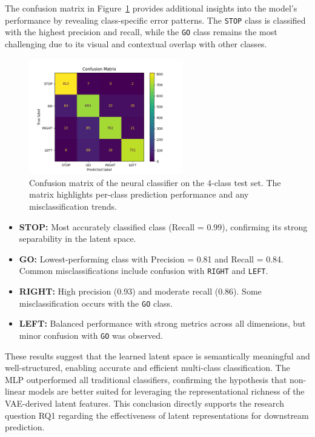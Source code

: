 The confusion matrix in Figure~\ref{fig:conf_matrix} provides additional insights into the model's performance by revealing class-specific error patterns. The \texttt{STOP} class is classified with the highest precision and recall, while the \texttt{GO} class remains the most challenging due to its visual and contextual overlap with other classes.

\begin{figure}[h]
    \centering
    \includegraphics[width=0.6\textwidth]{img/classifier/confusion_matrix_4_classes.png}
    \caption[Confusion matrix of neural classifier (4-class)]{%
Confusion matrix of the neural classifier on the 4-class test set. The matrix highlights per-class prediction performance and any misclassification trends.}
    \label{fig:conf_matrix}
\end{figure}

\begin{itemize}
    \item \textbf{STOP:} Most accurately classified class (Recall = 0.99), confirming its strong separability in the latent space.
    \item \textbf{GO:} Lowest-performing class with Precision = 0.81 and Recall = 0.84. Common misclassifications include confusion with \texttt{RIGHT} and \texttt{LEFT}.
    \item \textbf{RIGHT:} High precision (0.93) and moderate recall (0.86). Some misclassification occurs with the \texttt{GO} class.
    \item \textbf{LEFT:} Balanced performance with strong metrics across all dimensions, but minor confusion with \texttt{GO} was observed.
\end{itemize}

These results suggest that the learned latent space is semantically meaningful and well-structured, enabling accurate and efficient multi-class classification. The MLP outperformed all traditional classifiers, confirming the hypothesis that non-linear models are better suited for leveraging the representational richness of the VAE-derived latent features. This conclusion directly supports the research question RQ1 regarding the effectiveness of latent representations for downstream prediction.


